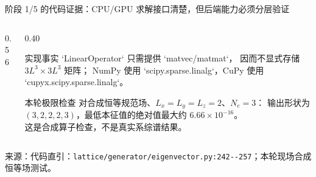 \documentclass[UTF8,aspectratio=169,11pt]{ctexbeamer}
\newcommand{\source}[1]{%
  \vspace{0.06em}\par{\raggedright\scriptsize\color{muted}来源：#1\par}}
\newcommand{\codepath}[1]{\nolinkurl{#1}}
\begin{document}
\begin{frame}[t]{阶段 1/5 的代码证据：CPU/GPU 求解接口清楚，但后端能力必须分层验证}
  \begin{columns}[T,totalwidth=\textwidth]
    \begin{column}{0.56\textwidth}
      
    \end{column}
    \begin{column}{0.40\textwidth}
      \begin{block}{实现事实}
        \small
        `LinearOperator` 只需提供 `matvec/matmat`，
        因而不显式存储 $3L^3\times3L^3$ 矩阵；
        NumPy 使用 `scipy.sparse.linalg`，CuPy 使用 `cupyx.scipy.sparse.linalg`。
      \end{block}
      \begin{block}{本轮极限检查}
        \small
        对合成恒等规范场、$L_x=L_y=L_z=2$、$N_e=3$：
        输出形状为 $(3,2,2,2,3)$，最低本征值的绝对值最大约
        $6.66\times10^{-16}$。\\[0.1em]
        \textcolor{evidence}{这是合成算子检查，不是真实系综谱结果。}
      \end{block}
    \end{column}
  \end{columns}
  \source{代码直引：\codepath{lattice/generator/eigenvector.py:242--257}；本轮现场合成恒等场测试。}
\end{frame}
\end{document}
